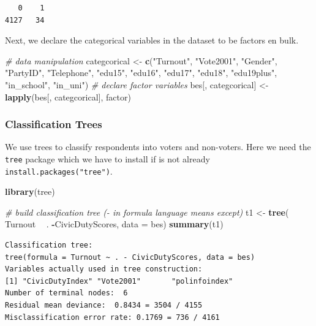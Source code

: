 \documentclass[]{article}
\newenvironment{Shaded}{\begin{snugshade}}{\end{snugshade}}
\newcommand{\CommentTok}[1]{\textcolor[rgb]{0.56,0.35,0.01}{\textit{#1}}}
\newcommand{\DataTypeTok}[1]{\textcolor[rgb]{0.13,0.29,0.53}{#1}}
\newcommand{\KeywordTok}[1]{\textcolor[rgb]{0.13,0.29,0.53}{\textbf{#1}}}
\newcommand{\NormalTok}[1]{#1}
\newcommand{\OperatorTok}[1]{\textcolor[rgb]{0.81,0.36,0.00}{\textbf{#1}}}
\newcommand{\StringTok}[1]{\textcolor[rgb]{0.31,0.60,0.02}{#1}}
\begin{document}
\begin{verbatim}
   0    1 
4127   34 
\end{verbatim}

Next, we declare the categorical variables in the dataset to be factors en bulk.

\begin{Shaded}
\begin{Highlighting}[]
\CommentTok{# data manipulation}
\NormalTok{categcorical <-}\StringTok{ }\KeywordTok{c}\NormalTok{(}\StringTok{"Turnout"}\NormalTok{, }\StringTok{"Vote2001"}\NormalTok{, }\StringTok{"Gender"}\NormalTok{, }\StringTok{"PartyID"}\NormalTok{, }\StringTok{"Telephone"}\NormalTok{, }\StringTok{"edu15"}\NormalTok{,}
                  \StringTok{"edu16"}\NormalTok{, }\StringTok{"edu17"}\NormalTok{, }\StringTok{"edu18"}\NormalTok{, }\StringTok{"edu19plus"}\NormalTok{, }\StringTok{"in_school"}\NormalTok{, }\StringTok{"in_uni"}\NormalTok{)}
\CommentTok{# declare factor variables}
\NormalTok{bes[, categcorical] <-}\StringTok{ }\KeywordTok{lapply}\NormalTok{(bes[, categcorical], factor)}
\end{Highlighting}
\end{Shaded}

\hypertarget{classification-trees}{%
\subsubsection{Classification Trees}\label{classification-trees}}

We use trees to classify respondents into voters and non-voters. Here we need the \texttt{tree} package which we have to install if is not already \texttt{install.packages("tree")}.

\begin{Shaded}
\begin{Highlighting}[]
\KeywordTok{library}\NormalTok{(tree)}

\CommentTok{# build classification tree (- in formula language means except)}
\NormalTok{t1 <-}\StringTok{ }\KeywordTok{tree}\NormalTok{( Turnout }\OperatorTok{~}\StringTok{ }\NormalTok{. }\OperatorTok{-}\NormalTok{CivicDutyScores, }\DataTypeTok{data =}\NormalTok{ bes)}
\KeywordTok{summary}\NormalTok{(t1)}
\end{Highlighting}
\end{Shaded}

\begin{verbatim}
Classification tree:
tree(formula = Turnout ~ . - CivicDutyScores, data = bes)
Variables actually used in tree construction:
[1] "CivicDutyIndex" "Vote2001"       "polinfoindex"  
Number of terminal nodes:  6 
Residual mean deviance:  0.8434 = 3504 / 4155 
Misclassification error rate: 0.1769 = 736 / 4161 
\end{verbatim}
\end{document}
